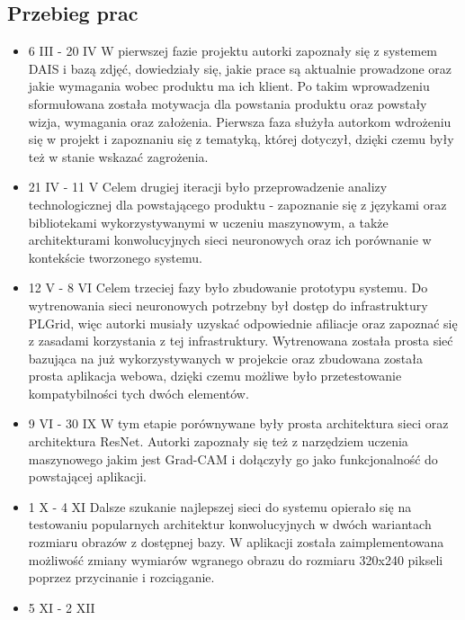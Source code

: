 \documentclass[polish,12pt]{aghthesis}
\begin{document}
\subsection{Przebieg prac}
\begin{itemize}
  \item 6 III - 20 IV \newline
W pierwszej fazie projektu autorki zapoznały się z systemem DAIS i bazą zdjęć, dowiedziały się, jakie prace są aktualnie prowadzone oraz jakie wymagania wobec produktu ma ich klient. Po takim wprowadzeniu sformułowana została motywacja dla powstania produktu oraz powstały wizja, wymagania oraz założenia. Pierwsza faza służyła autorkom wdrożeniu się w projekt i zapoznaniu się z tematyką, której dotyczył, dzięki czemu były też w stanie wskazać zagrożenia.
  \item 21 IV - 11 V \newline
Celem drugiej iteracji było przeprowadzenie analizy technologicznej dla powstającego produktu - zapoznanie się z językami oraz bibliotekami wykorzystywanymi w uczeniu maszynowym, a także architekturami konwolucyjnych sieci neuronowych oraz ich porównanie w kontekście tworzonego systemu. 
  \item 12 V - 8 VI \newline
Celem trzeciej fazy było zbudowanie prototypu systemu. Do wytrenowania sieci neuronowych potrzebny był dostęp do infrastruktury PLGrid, więc autorki musiały uzyskać odpowiednie afiliacje oraz zapoznać się z zasadami korzystania z tej infrastruktury. Wytrenowana została prosta sieć bazująca na już wykorzystywanych w projekcie oraz zbudowana została prosta aplikacja webowa, dzięki czemu możliwe było przetestowanie kompatybilności tych dwóch elementów. 
  \item 9 VI - 30 IX \newline
W tym etapie porównywane były prosta architektura sieci oraz architektura ResNet. Autorki zapoznały się też z narzędziem uczenia maszynowego jakim jest Grad-CAM i dołączyły go jako funkcjonalność do powstającej aplikacji.
  \item 1 X - 4 XI \newline
Dalsze szukanie najlepszej sieci do systemu opierało się na testowaniu popularnych architektur konwolucyjnych w dwóch wariantach rozmiaru obrazów z dostępnej bazy. W aplikacji została zaimplementowana możliwość zmiany wymiarów wgranego obrazu do rozmiaru 320x240 pikseli poprzez przycinanie i rozciąganie.
  \item 5 XI - 2 XII \newline

\end{itemize}
\end{document}
